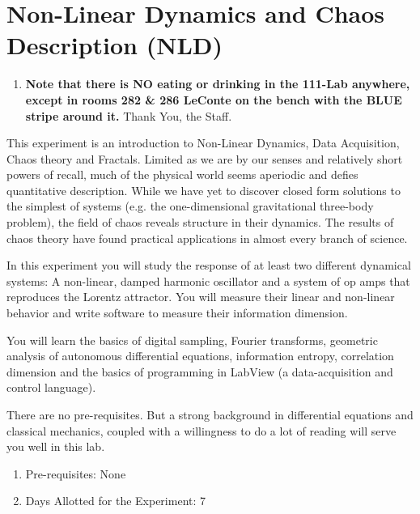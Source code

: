 \documentclass{../lab}
\begin{document}
\maketitle

\tableofcontents

\section{Non-Linear Dynamics and Chaos Description (NLD)}

\begin{enumerate}
    \item \textbf{Note that there is NO eating or drinking in the 111-Lab anywhere, except in rooms 282 \& 286 LeConte on the bench with the BLUE stripe around it.} Thank You, the Staff.
\end{enumerate}

This experiment is an introduction to Non-Linear Dynamics, Data Acquisition, Chaos theory and Fractals. Limited as we are by our senses and relatively short powers of recall, much of the physical world seems aperiodic and defies quantitative description. While we have yet to discover closed form solutions to the simplest of systems (e.g. the one-dimensional gravitational three-body problem), the field of chaos reveals structure in their dynamics. The results of chaos theory have found practical applications in almost every branch of science.

In this experiment you will study the response of at least two different dynamical systems: A non-linear, damped harmonic oscillator and a system of op amps that reproduces the Lorentz attractor. You will measure their linear and non-linear behavior and write software to measure their information dimension.

You will learn the basics of digital sampling, Fourier transforms, geometric analysis of autonomous differential equations, information entropy, correlation dimension and the basics of programming in LabView (a data-acquisition and control language).

There are no pre-requisites. But a strong background in differential equations and classical mechanics, coupled with a willingness to do a lot of reading will serve you well in this lab.

\begin{enumerate}
    \item Pre-requisites: None

    \item Days Allotted for the Experiment: 7

\end{enumerate}
\end{document}
